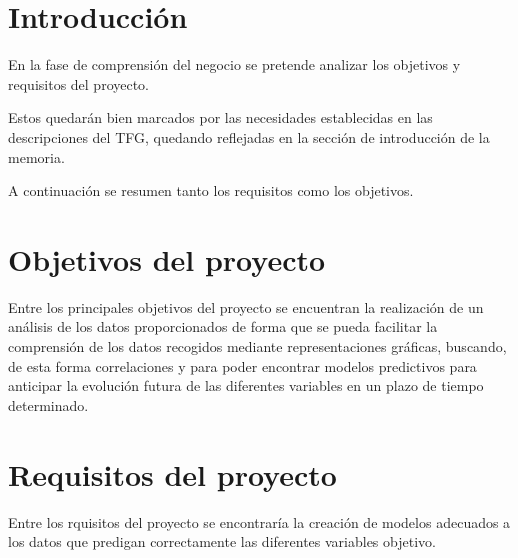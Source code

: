 
\section{Introducción}
En la fase de comprensión del negocio se pretende analizar los objetivos y requisitos del 
proyecto.

Estos quedarán bien marcados por las necesidades establecidas en las descripciones
del TFG, quedando reflejadas en la sección de introducción de la memoria.

A continuación se resumen tanto los requisitos como los objetivos.

\section{Objetivos del proyecto}
Entre los principales objetivos del proyecto se encuentran la realización de un análisis
de los datos proporcionados de forma que se pueda facilitar la comprensión de los
datos recogidos mediante representaciones gráficas, buscando, de esta forma correlaciones
y para poder encontrar modelos predictivos para anticipar la evolución futura de las 
diferentes variables en un plazo de tiempo determinado.

\section{Requisitos del proyecto}
Entre los rquisitos del proyecto se encontraría la creación de modelos adecuados a los datos
que predigan correctamente las diferentes variables objetivo.
